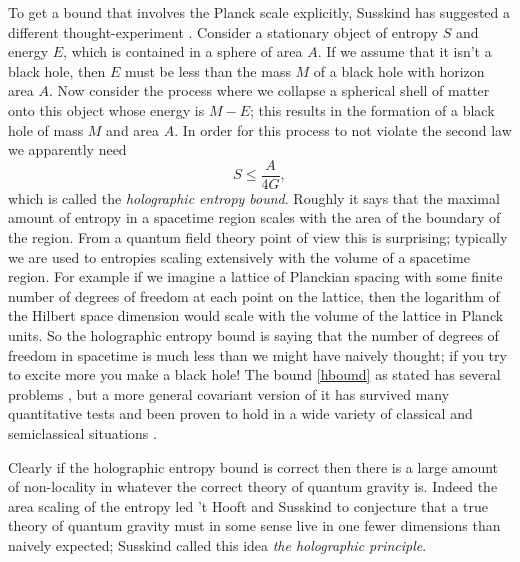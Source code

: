 \documentclass[12pt]{article}
\newcommand{\be}{\begin{equation}}
\newcommand{\ee}{\end{equation}}
\begin{document}
To get a bound that involves the Planck scale explicitly, Susskind has suggested a different thought-experiment \cite{Susskind:1994vu}.  Consider a stationary object of entropy $S$ and energy $E$, which is contained in a sphere of area $A$.  If we assume that it isn't a black hole, then $E$ must be less than the mass $M$ of a black hole with horizon area $A$.  Now consider the process where we collapse a spherical shell of matter onto this object whose energy is $M-E$; this results in the formation of a black hole of mass $M$ and area $A$.  In order for this process to not violate the second law we apparently need
\be\label{hbound}
S\leq \frac{A}{4G},
\ee
which is called the \textit{holographic entropy bound}.  Roughly it says that the maximal amount of entropy in a spacetime region scales with the area of the boundary of the region.  From a quantum field theory point of view this is surprising; typically we are used to entropies scaling extensively with the volume of a spacetime region.  For example if we imagine a lattice of Planckian spacing with some finite number of degrees of freedom at each point on the lattice, then the logarithm of the Hilbert space dimension would scale with the volume of the lattice in Planck units.  So the holographic entropy bound is saying that the number of degrees of freedom in spacetime is much less than we might have naively thought; if you try to excite more you make a black hole!  The bound \eqref{hbound} as stated has several problems \cite{Bousso:2002ju}, but a more general covariant version of it \cite{Bousso:1999xy,Bousso:1999cb} has survived many quantitative tests and been proven to hold in a wide variety of classical and semiclassical situations \cite{Flanagan:1999jp,Wall:2010cj,Wall:2011hj,Bousso:2014sda}.  

Clearly if the holographic entropy bound is correct then there is a large amount of non-locality in whatever the correct theory of quantum gravity is.  Indeed the area scaling of the entropy led 't Hooft and Susskind \cite{tHooft:1993gx,Susskind:1994vu} to conjecture that a true theory of quantum gravity must in some sense live in one fewer dimensions than naively expected; Susskind called this idea  \textit{the holographic principle}.  
\end{document}
